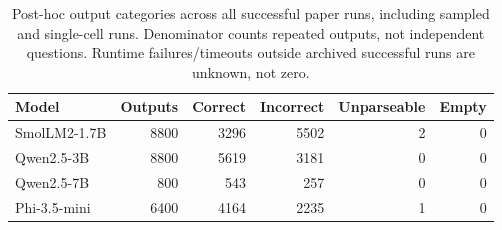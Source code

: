 \begin{table}[tbp]
\centering\small
\caption{Post-hoc output categories across all successful paper runs, including sampled and single-cell runs. Denominator counts repeated outputs, not independent questions. Runtime failures/timeouts outside archived successful runs are unknown, not zero.}\label{tab:failures}
\begin{tabular}{lrrrrr}\toprule
Model & Outputs & Correct & Incorrect & Unparseable & Empty \\
\midrule
SmolLM2-1.7B & 8800 & 3296 & 5502 & 2 & 0 \\
Qwen2.5-3B & 8800 & 5619 & 3181 & 0 & 0 \\
Qwen2.5-7B & 800 & 543 & 257 & 0 & 0 \\
Phi-3.5-mini & 6400 & 4164 & 2235 & 1 & 0 \\
\bottomrule\end{tabular}
\end{table}
